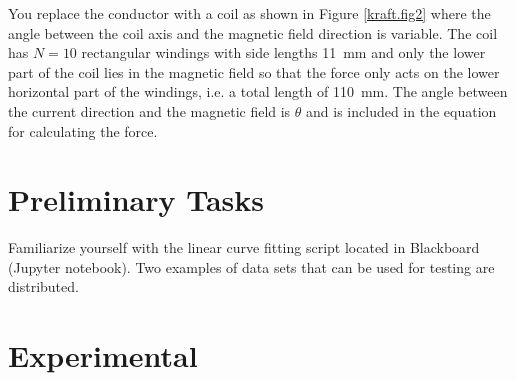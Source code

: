 \documentclass[../Elmag-labhefte-2020.tex]{subfiles}
\begin{document}
You replace the conductor with a coil as shown in Figure \ref{kraft.fig2} where the angle between the coil axis and the magnetic field direction is variable. The coil has $N = 10$ rectangular windings with side lengths \SI{11}{\mm} and only the lower part of the coil lies in the magnetic field so that the force only acts on the lower horizontal part of the windings, i.e. a total length of \SI{110}{\mm}. The angle between the current direction and the magnetic field is $\theta$ and is included in the equation for calculating the force.








\section{Preliminary Tasks}
Familiarize yourself with the linear curve fitting script located in Blackboard (Jupyter notebook). Two examples of data sets that can be used for testing are distributed.

\section{Experimental \label{ch.kraft.eksp}}
\end{document}
